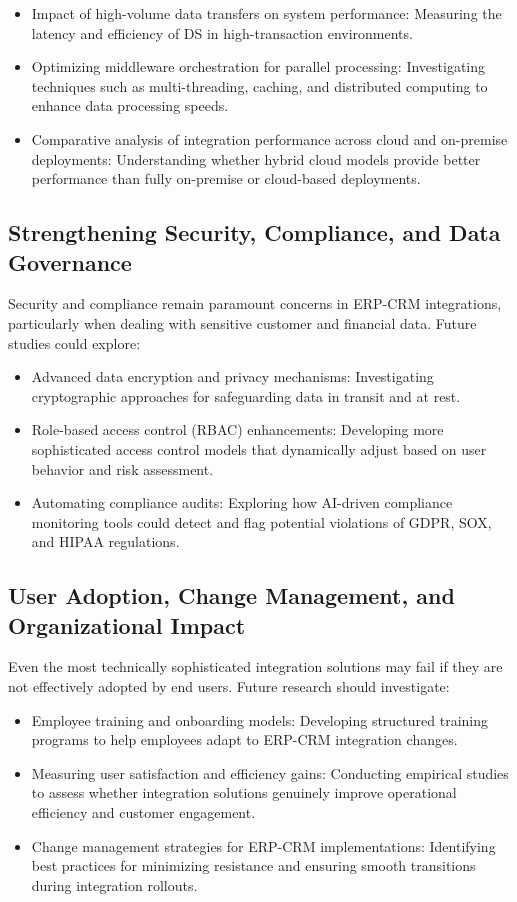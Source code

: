\begin{itemize}
    \item Impact of high-volume data transfers on system performance: Measuring the latency and efficiency of DS in high-transaction environments.
    \item Optimizing middleware orchestration for parallel processing: Investigating techniques such as multi-threading, caching, and distributed computing to enhance data processing speeds.
    \item Comparative analysis of integration performance across cloud and on-premise deployments: Understanding whether hybrid cloud models provide better performance than fully on-premise or cloud-based deployments.
\end{itemize}

\subsection{Strengthening Security, Compliance, and Data Governance}
Security and compliance remain paramount concerns in ERP-CRM integrations, particularly when dealing with sensitive customer and financial data. Future studies could explore:

\begin{itemize}
    \item Advanced data encryption and privacy mechanisms: Investigating cryptographic approaches for safeguarding data in transit and at rest.
    \item Role-based access control (RBAC) enhancements: Developing more sophisticated access control models that dynamically adjust based on user behavior and risk assessment.
    \item Automating compliance audits: Exploring how AI-driven compliance monitoring tools could detect and flag potential violations of GDPR, SOX, and HIPAA regulations.
\end{itemize}

\subsection{User Adoption, Change Management, and Organizational Impact}
Even the most technically sophisticated integration solutions may fail if they are not effectively adopted by end users. Future research should investigate:

\begin{itemize}
    \item Employee training and onboarding models: Developing structured training programs to help employees adapt to ERP-CRM integration changes.
    \item Measuring user satisfaction and efficiency gains: Conducting empirical studies to assess whether integration solutions genuinely improve operational efficiency and customer engagement.
    \item Change management strategies for ERP-CRM implementations: Identifying best practices for minimizing resistance and ensuring smooth transitions during integration rollouts.
\end{itemize}

